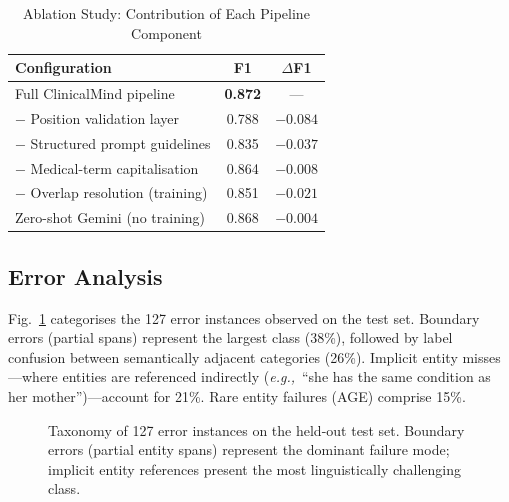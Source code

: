 \documentclass[conference]{IEEEtran}
\newcommand{\eg}{\textit{e.g.,}~}
\begin{document}
\begin{table}[t]
\centering
\caption{Ablation Study: Contribution of Each Pipeline Component}
\label{tab:ablation}
\begin{tabular}{lcc}
\toprule
\textbf{Configuration} & \textbf{F1} & \textbf{$\Delta$F1} \\
\midrule
Full ClinicalMind pipeline              & \textbf{0.872} & — \\
\quad $-$ Position validation layer     & 0.788 & $-0.084$ \\
\quad $-$ Structured prompt guidelines  & 0.835 & $-0.037$ \\
\quad $-$ Medical-term capitalisation   & 0.864 & $-0.008$ \\
\quad $-$ Overlap resolution (training) & 0.851 & $-0.021$ \\
\quad Zero-shot Gemini (no training)    & 0.868 & $-0.004$ \\
\bottomrule
\end{tabular}
\end{table}

\subsection{Error Analysis}

Fig.~\ref{fig:error_taxonomy} categorises the 127 error instances observed
on the test set. Boundary errors (partial spans) represent the largest class
(38\%), followed by label confusion between semantically adjacent categories
(26\%). Implicit entity misses—where entities are referenced indirectly
(\eg ``she has the same condition as her mother'')—account for 21\%. Rare
entity failures (AGE) comprise 15\%.

\begin{figure}[t]
\centering
{}
\caption{Taxonomy of 127 error instances on the held-out test set.
Boundary errors (partial entity spans) represent the dominant failure mode;
implicit entity references present the most linguistically challenging class.}
\label{fig:error_taxonomy}
\end{figure}
\end{document}
